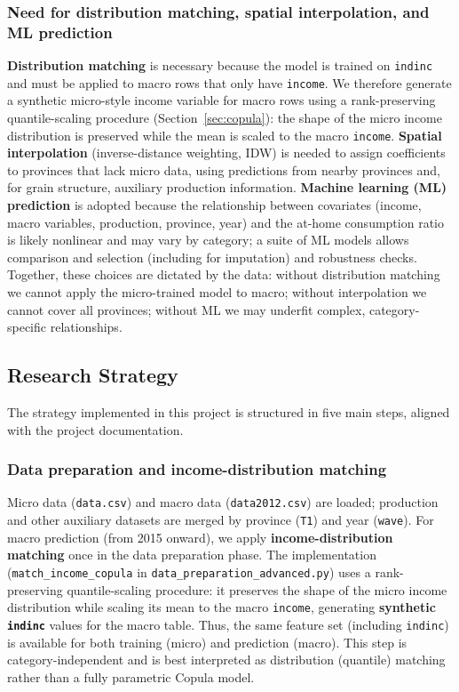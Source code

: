 \subsubsection{Need for distribution matching, spatial interpolation, and ML prediction}
\label{subsec:need-for-methods}

\textbf{Distribution matching} is necessary because the model is trained on \texttt{indinc} and must be applied to macro rows that only have \texttt{income}. We therefore generate a synthetic micro-style income variable for macro rows using a rank-preserving quantile-scaling procedure (Section~\ref{sec:copula}): the shape of the micro income distribution is preserved while the mean is scaled to the macro \texttt{income}. \textbf{Spatial interpolation} (inverse-distance weighting, IDW) is needed to assign coefficients to provinces that lack micro data, using predictions from nearby provinces and, for grain structure, auxiliary production information. \textbf{Machine learning (ML) prediction} is adopted because the relationship between covariates (income, macro variables, production, province, year) and the at-home consumption ratio is likely nonlinear and may vary by category; a suite of ML models allows comparison and selection (including for imputation) and robustness checks. Together, these choices are dictated by the data: without distribution matching we cannot apply the micro-trained model to macro; without interpolation we cannot cover all provinces; without ML we may underfit complex, category-specific relationships.

\subsection{Research Strategy}
\label{subsec:research-strategy}

The strategy implemented in this project is structured in five main steps, aligned with the project documentation.

\subsubsection{Data preparation and income-distribution matching}
\label{subsec:copula}

Micro data (\texttt{data.csv}) and macro data (\texttt{data2012.csv}) are loaded; production and other auxiliary datasets are merged by province (\texttt{T1}) and year (\texttt{wave}). For macro prediction (from 2015 onward), we apply \textbf{income-distribution matching} once in the data preparation phase. The implementation (\texttt{match\_income\_copula} in \texttt{data\_preparation\_advanced.py}) uses a rank-preserving quantile-scaling procedure: it preserves the shape of the micro income distribution while scaling its mean to the macro \texttt{income}, generating \textbf{synthetic \texttt{indinc}} values for the macro table. Thus, the same feature set (including \texttt{indinc}) is available for both training (micro) and prediction (macro). This step is category-independent and is best interpreted as distribution (quantile) matching rather than a fully parametric Copula model.

